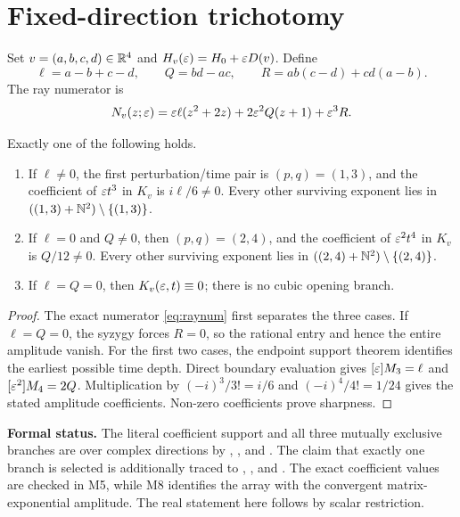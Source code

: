 \section{Fixed-direction trichotomy}\label{sec:fixed}

Set \(v=(a,b,c,d)\in\mathbb R^4\) and \(H_v(\varepsilon)=H_0+\varepsilon D(v)\).  Define
\[
\ell=a-b+c-d,\qquad Q=bd-ac,\qquad
R=ab(c-d)+cd(a-b).
\]
The ray numerator is
\begin{equation}\label{eq:raynum}
N_v(z;\varepsilon)=\varepsilon\ell(z^2+2z)+2\varepsilon^2Q(z+1)+\varepsilon^3R.
\end{equation}

\begin{theorem}\label{thm:trichotomy}
Exactly one of the following holds.
\begin{enumerate}[label=(\alph*)]
\item If \(\ell\ne0\), the first perturbation/time pair is
      \((p,q)=(1,3)\), and the coefficient of \(\varepsilon t^3\) in \(K_v\) is
      \(i\ell/6\ne0\).
      Every other surviving exponent lies in
      \(((1,3)+\mathbb N^2)\setminus\{(1,3)\}\).
\item If \(\ell=0\) and \(Q\ne0\), then \((p,q)=(2,4)\), and the coefficient
      of \(\varepsilon^2t^4\) in \(K_v\) is \(Q/12\ne0\).
      Every other surviving exponent lies in
      \(((2,4)+\mathbb N^2)\setminus\{(2,4)\}\).
\item If \(\ell=Q=0\), then \(K_v(\varepsilon,t)\equiv0\); there is no cubic
      opening branch.
\end{enumerate}
\end{theorem}
\begin{proof}
The exact numerator \cref{eq:raynum} first separates the three cases.  If
\(\ell=Q=0\), the syzygy forces \(R=0\), so the rational entry and hence the
entire amplitude vanish.  For the first two cases, the endpoint support theorem
identifies the earliest possible time depth.  Direct boundary evaluation gives
\([\varepsilon]M_3=\ell\) and \([\varepsilon^2]M_4=2Q\).  Multiplication by
\((-i)^3/3!=i/6\) and \((-i)^4/4!=1/24\) gives the stated amplitude
coefficients.  Non-zero coefficients prove sharpness.
\end{proof}

\noindent\textbf{Formal status.}
The literal coefficient support and all three mutually exclusive branches are
 over complex directions by
,
,
 and
.  The claim that exactly one branch is selected
is additionally traced to ,
,
 and .  The exact
coefficient values are checked in M5, while M8 identifies the array with the
convergent matrix-exponential amplitude.  The real statement here follows by
scalar restriction.

